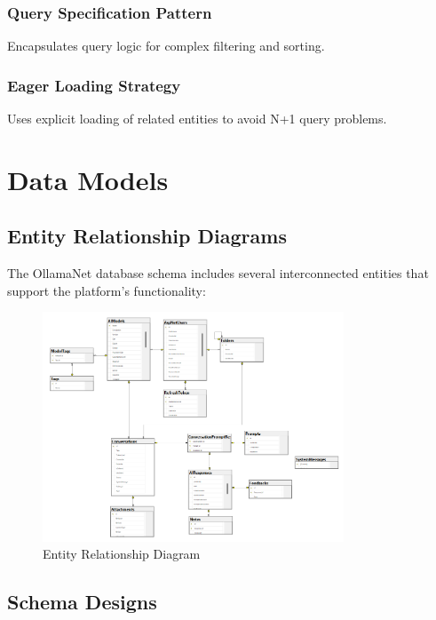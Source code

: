 \subsubsection*{Query Specification Pattern}

Encapsulates query logic for complex filtering and sorting.

\subsubsection*{Eager Loading Strategy}

Uses explicit loading of related entities to avoid N+1 query problems.

\section{Data Models}

\subsection{Entity Relationship Diagrams}

The OllamaNet database schema includes several interconnected entities that support the platform's functionality:

\begin{figure}
    \centering
    \includegraphics[width=0.8\textwidth]{./Chapter05/figures/entity_relationship.png}
    \caption{Entity Relationship Diagram}
    \label{fig:entity-relationship}
\end{figure}

\subsection{Schema Designs}

